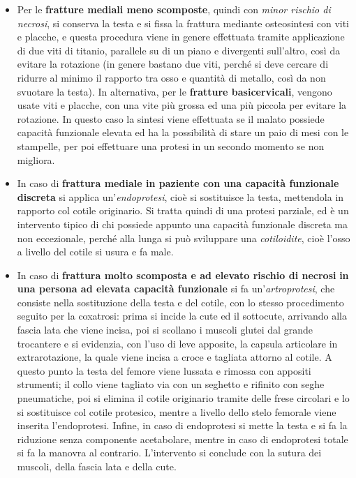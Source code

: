 \begin{itemize}
\item
  Per le \textbf{fratture mediali meno scomposte}, quindi con
  \emph{minor rischio di necrosi}, si conserva la testa e si fissa la
  frattura mediante osteosintesi con viti e placche, e questa procedura
  viene in genere effettuata tramite applicazione di due viti di
  titanio, parallele su di un piano e divergenti sull'altro, così da
  evitare la rotazione (in genere bastano due viti, perché si deve
  cercare di ridurre al minimo il rapporto tra osso e quantità di
  metallo, così da non svuotare la testa). In alternativa, per le
  \textbf{fratture basicervicali}, vengono usate viti e placche, con una
  vite più grossa ed una più piccola per evitare la rotazione. In questo
  caso la sintesi viene effettuata se il malato possiede capacità
  funzionale elevata ed ha la possibilità di stare un paio di mesi con
  le stampelle, per poi effettuare una protesi in un secondo momento se
  non migliora.
\item
  In caso di \textbf{frattura mediale in paziente con una capacità
  funzionale discreta} si applica un'\emph{endoprotesi}, cioè si
  sostituisce la testa, mettendola in rapporto col cotile originario. Si
  tratta quindi di una protesi parziale, ed è un intervento tipico di
  chi possiede appunto una capacità funzionale discreta ma non
  eccezionale, perché alla lunga si può sviluppare una
  \emph{cotiloidite}, cioè l'osso a livello del cotile si usura e fa
  male.
\item
  In caso di \textbf{frattura molto scomposta e ad elevato rischio di
  necrosi} \textbf{in una persona ad elevata capacità funzionale} si fa
  un'\emph{artroprotesi}, che consiste nella sostituzione della testa e
  del cotile, con lo stesso procedimento seguito per la coxatrosi: prima
  si incide la cute ed il sottocute, arrivando alla fascia lata che
  viene incisa, poi si scollano i muscoli glutei dal grande trocantere e
  si evidenzia, con l'uso di leve apposite, la capsula articolare in
  extrarotazione, la quale viene incisa a croce e tagliata attorno al
  cotile. A questo punto la testa del femore viene lussata e rimossa con
  appositi strumenti; il collo viene tagliato via con un seghetto e
  rifinito con seghe pneumatiche, poi si elimina il cotile originario
  tramite delle frese circolari e lo si sostituisce col cotile
  protesico, mentre a livello dello stelo femorale viene inserita
  l'endoprotesi. Infine, in caso di endoprotesi si mette la testa e si
  fa la riduzione senza componente acetabolare, mentre in caso di
  endoprotesi totale si fa la manovra al contrario. L'intervento si
  conclude con la sutura dei muscoli, della fascia lata e della cute.
\end{itemize}

